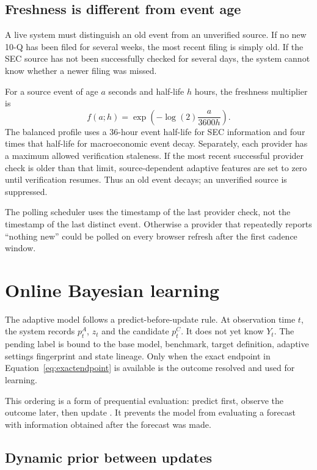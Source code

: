 \documentclass[11pt]{article}
\begin{document}
\subsection{Freshness is different from event age}

A live system must distinguish an old event from an unverified source. If no new 10-Q has been filed for several weeks, the most recent filing is simply old. If the SEC source has not been successfully checked for several days, the system cannot know whether a newer filing was missed.

For a source event of age $a$ seconds and half-life $h$ hours, the freshness multiplier is
\begin{equation}
f(a;h)=\exp\left(-\log(2)\frac{a}{3600h}\right).
\label{eq:freshness}
\end{equation}
The balanced profile uses a 36-hour event half-life for SEC information and four times that half-life for macroeconomic event decay. Separately, each provider has a maximum allowed verification staleness. If the most recent successful provider check is older than that limit, source-dependent adaptive features are set to zero until verification resumes. Thus an old event decays; an unverified source is suppressed.

The polling scheduler uses the timestamp of the last provider check, not the timestamp of the last distinct event. Otherwise a provider that repeatedly reports ``nothing new'' could be polled on every browser refresh after the first cadence window.

\section{Online Bayesian learning}
\label{sec:online}

The adaptive model follows a predict-before-update rule. At observation time $t$, the system records $p_t^A$, $z_t$ and the candidate $p_t^C$. It does not yet know $Y_t$. The pending label is bound to the base model, benchmark, target definition, adaptive settings fingerprint and state lineage. Only when the exact endpoint in Equation~\eqref{eq:exactendpoint} is available is the outcome resolved and used for learning.

This ordering is a form of prequential evaluation: predict first, observe the outcome later, then update \citep{dawid1984prequential}. It prevents the model from evaluating a forecast with information obtained after the forecast was made.

\subsection{Dynamic prior between updates}
\end{document}
